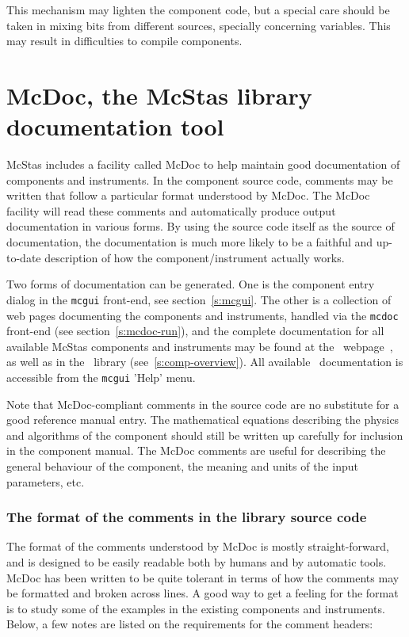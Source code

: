 This mechanism may lighten the component code, but a special care should be taken in mixing bits from different sources, specially concerning variables. This may result in difficulties to compile components.

\section{McDoc, the McStas library documentation tool}
\label{s:mcdoc}

McStas includes a facility called McDoc to help maintain good documentation of
components and instruments. In the component source code, comments may be
written that follow a particular format understood by McDoc. The McDoc facility
will read these comments and automatically produce output documentation in
various forms. By using the source code itself as the source of documentation,
the documentation is much more likely to be a faithful and up-to-date
description of how the component/instrument actually works.

Two forms of documentation can be generated. One
is the component entry dialog in the \verb+mcgui+ front-end, see
section~\ref{s:mcgui}. The other is a collection of web pages documenting
the components and instruments, handled via the \verb+mcdoc+ front-end (see section~\ref{s:mcdoc-run}), and the complete documentation for all available
McStas components and instruments may be found at the \MCS\
webpage~\cite{mcstas_webpage}, as well as in the \MCS\ library
(see~\ref{s:comp-overview}). All available \MCS\ documentation is accessible from the \verb+mcgui+ 'Help' menu.

Note that McDoc-compliant comments in the source code are no substitute
for a good reference manual entry. The mathematical equations describing
the physics and algorithms of the component should still be written up
carefully for inclusion in the component manual. The McDoc comments are
useful for describing the general behaviour of the component, the
meaning and units of the input parameters, etc.


\subsubsection{The format of the comments in the library source code}

The format of the comments understood by McDoc is mostly
straight-forward, and is designed to be easily readable both by humans
and by automatic tools. McDoc has been written to be quite tolerant in
terms of how the comments may be formatted and broken across lines. A
good way to get a feeling for the format is to study some of the examples
in the existing components and instruments. Below, a few
notes are listed on the requirements for the comment headers:

